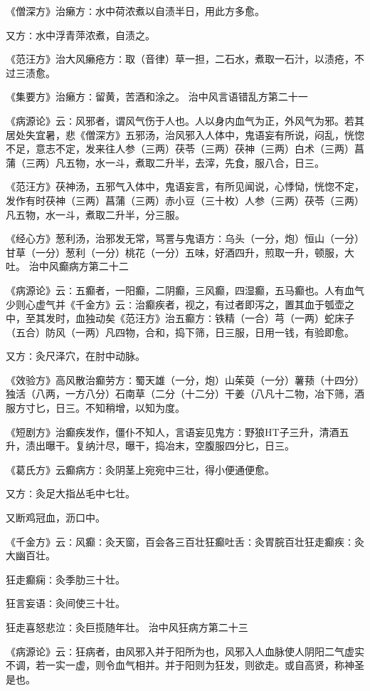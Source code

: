 \documentclass[a4paper,12pt,UTF8,twoside]{ctexbook}
\begin{document}
《僧深方》治癞方∶水中荷浓煮以自渍半日，用此方多愈。

又方∶水中浮青萍浓煮，自渍之。

《范汪方》治大风癞疮方∶取（音律）草一担，二石水，煮取一石汁，以渍疮，不过三渍愈。

《集要方》治癞方∶留黄，苦酒和涂之。
治中风言语错乱方第二十一

《病源论》云∶风邪者，谓风气伤于人也。人以身内血气为正，外风气为邪。若其居处失宜暑，悲《僧深方》五邪汤，治风邪入人体中，鬼语妄有所说，闷乱，恍惚不足，意志不定，发来往人参（三两）茯苓（三两）茯神（三两）白术（三两）菖蒲（三两）凡五物，水一斗，煮取二升半，去滓，先食，服八合，日三。

《范汪方》茯神汤，五邪气入体中，鬼语妄言，有所见闻说，心悸恸，恍惚不定，发作有时茯神（三两）菖蒲（三两）赤小豆（三十枚）人参（三两）茯苓（三两）凡五物，水一斗，煮取二升半，分三服。

《经心方》葱利汤，治邪发无常，骂詈与鬼语方∶乌头（一分，炮）恒山（一分）甘草（一分）葱利（一分）桃花（一分）五味，好酒四升，煎取一升，顿服，大吐。
治中风癫病方第二十二

《病源论》云∶五癫者，一阳癫，二阴癫，三风癫，四湿癫，五马癫也。人有血气少则心虚气并《千金方》云∶治癫疾者，视之，有过者即泻之，置其血于瓠壶之中，至其发时，血独动矣《范汪方》治五癫方∶铁精（一合）芎（一两）蛇床子（五合）防风（一两）凡四物，合和，捣下筛，日三服，日用一钱，有验即愈。

又方∶灸尺泽穴，在肘中动脉。

《效验方》高风散治癫劳方∶蜀天雄（一分，炮）山茱萸（一分）薯蓣（十四分）独活（八两，一方八分）石南草（二分（十二分）干姜（八凡十二物，冶下筛，酒服方寸匕，日三。不知稍增，以知为度。

《短剧方》治癫疾发作，僵仆不知人，言语妄见鬼方∶野狼HT子三升，清酒五升，渍出曝干。复纳汁尽，曝干，捣冶末，空腹服四分匕，日三。

《葛氏方》云癫病方∶灸阴茎上宛宛中三壮，得小便通便愈。

又方∶灸足大指丛毛中七壮。

又断鸡冠血，沥口中。

《千金方》云∶风癫∶灸天窗，百会各三百壮狂癫吐舌∶灸胃脘百壮狂走癫疾∶灸大幽百壮。

狂走癫痫∶灸季肋三十壮。

狂言妄语∶灸间使三十壮。

狂走喜怒悲泣∶灸巨揽随年壮。
治中风狂病方第二十三

《病源论》云∶狂病者，由风邪入并于阳所为也，风邪入人血脉使人阴阳二气虚实不调，若一实一虚，则令血气相并。并于阳则为狂发，则欲走。或自高贤，称神圣是也。
\end{document}
